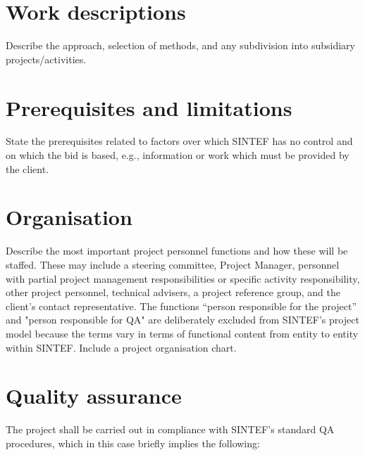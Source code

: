 \documentclass[unrestricted]{sintefprojectoffer}
\begin{document}
\section{Work descriptions}
Describe the approach, selection of methods, and any subdivision into
subsidiary projects/activities.

\section{Prerequisites and limitations}
State the prerequisites related to factors over which SINTEF has no control
and on which the bid is based, e.g., information or work which must be
provided by the client.

\section{Organisation}
Describe the most important project personnel functions and how these will
be staffed.
These may include a steering committee, Project Manager, personnel with
partial project management responsibilities or specific activity
responsibility, other project personnel, technical advisers, a project
reference group, and the client's contact representative.
The functions ``person responsible for the project'' and "person responsible
for QA" are deliberately excluded from SINTEF's project model because the
terms vary in terms of functional content from entity to entity within SINTEF.
Include a project organisation chart.

\section{Quality assurance}
The project shall be carried out in compliance with SINTEF's standard QA
procedures, which in this case briefly implies the following:
\end{document}
